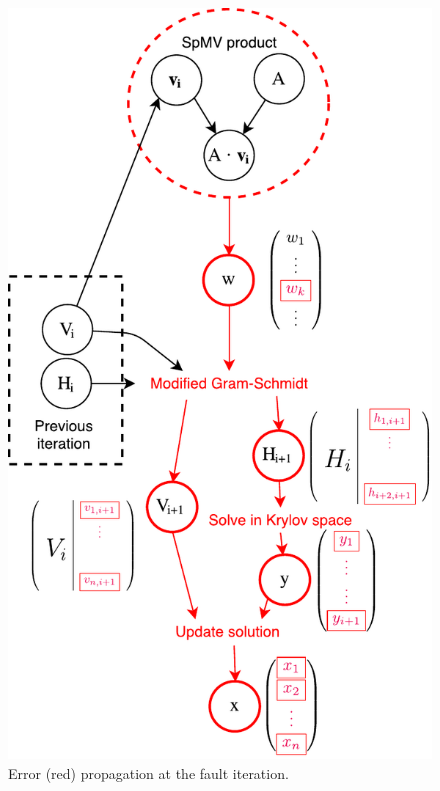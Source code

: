 \begin{figure}[h]
\centering
\includegraphics[scale=0.5]{figures/error_propagation.pdf}
\caption{Error (red) propagation at the fault iteration.}\label{fig:error_propagation}
\end{figure}

